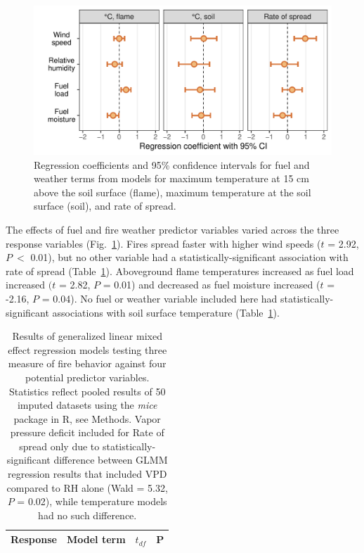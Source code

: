 \documentclass[referee, 
		     sn-basic]{sn-jnl}
\begin{document}
\begin{linenumbers}
\begin{figure}
\includegraphics[width = 1\columnwidth]{CI_gg-1.pdf}
\caption{Regression coefficients and 95\% confidence intervals for fuel
and weather terms from models for maximum temperature at 15 cm above the
soil surface (flame), maximum temperature at the soil surface (soil),
and rate of spread.}
\label{CIs}
\end{figure}


The effects of fuel and fire weather predictor variables varied across the three response variables (Fig.~\ref{CIs}). 
Fires spread faster with higher wind speeds ($t$ = 2.92, $P~<$ 0.01), but no other variable had a statistically-significant association with rate of spread (Table~\ref{RegResults}).
Aboveground flame temperatures increased as fuel load increased $(t$ = 2.82, $P$ = 0.01) and decreased as fuel moisture increased ($t$ = -2.16, $P$ = 0.04). 
No fuel or weather variable included here had statistically-significant associations with soil surface temperature
(Table~\ref{RegResults}).

\begin{table}
\caption{Results of generalized linear mixed effect regression models testing three measure of fire behavior against four potential predictor variables. 
Statistics reflect pooled results of 50 imputed datasets using the \emph{mice} package in \textsf{R},  see Methods. Vapor pressure deficit
included for Rate of spread only due to statistically-significant
difference between GLMM regression results that included VPD compared to
RH alone (Wald = 5.32, $P$ = 0.02), while temperature models had no such
difference. \label{RegResults} }
\centering 
\begin{tabular}{llcc}
\toprule
Response & Model term & $t_{df}$ & P \\
\midrule


\end{tabular}
\end{table}
\end{linenumbers}
\end{document}

